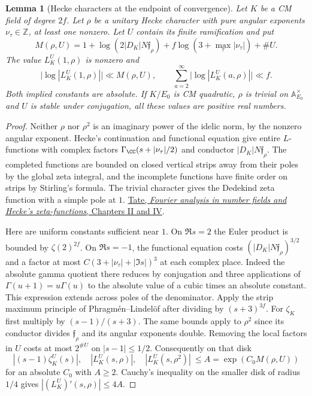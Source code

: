 \documentclass[a4paper,11pt]{article}
\newtheorem{lemma}[proposition]{Lemma}
\theoremstyle{definition}
\theoremstyle{remark}
\newcommand{\ZZ}{\mathbb Z}\newcommand{\ord}{\operatorname{ord}}
\numberwithin{equation}{section}
\begin{document}
\begin{lemma}[Hecke characters at the endpoint of convergence]
\label{lem:hecke171}
Let \(K\) be a CM field of degree \(2f\). Let \(\rho\) be a
unitary Hecke character with pure angular exponents
\(\nu_\tau\in\ZZ\), at least one nonzero. Let \(U\) contain its
finite ramification and put
\[
 M(\rho,U)=1+\log(2|D_K|N\mathfrak f_\rho)
       +f\log(3+\max_\tau|\nu_\tau|)+\#U .
\]
The value \(L_K^U(1,\rho)\) is nonzero and
\[
 \big|\log|L_K^U(1,\rho)|\big|\ll M(\rho,U),\qquad
 \sum_{a=2}^{\infty}\big|\log|L_K^U(a,\rho)|\big|\ll f .
\]
Both implied constants are absolute. If \(K/E_0\) is CM
quadratic, \(\rho\) is trivial on \(\mathbb A_{E_0}^\times\)
and \(U\) is stable under conjugation, all these values are
positive real numbers.
\end{lemma}
\begin{proof}
Neither \(\rho\) nor \(\rho^2\) is an imaginary power of
the idelic norm, by the nonzero angular exponent. Hecke's
continuation and functional equation give entire \(L\)-functions
with complex factors \(\Gamma_{\CC}(s+|\nu_\tau|/2)\) and
conductor \(|D_K|N\mathfrak f_\rho\). The completed functions
are bounded on closed vertical strips away from their poles
by the global zeta integral, and the incomplete functions have
finite order on strips by Stirling's formula. The trivial
character gives the Dedekind zeta function with a simple pole
at \(1\).
\href{https://sites.math.rutgers.edu/~alexk/2023S572/Tate1950.pdf}
{Tate, \emph{Fourier analysis in number fields and Hecke's
zeta-functions}, Chapters II and IV}.

Here are uniform constants sufficient near \(1\).
On \(\Re s=2\) the Euler product is bounded by
\(\zeta(2)^{2f}\). On \(\Re s=-1\), the functional equation
costs \((|D_K|N\mathfrak f_\rho)^{3/2}\) and a factor at most
\(C(3+|\nu_\tau|+|\Im s|)^3\) at each complex place.
Indeed the absolute gamma quotient there reduces by conjugation
and three applications of \(\Gamma(u+1)=u\Gamma(u)\) to
the absolute value of a cubic times an absolute constant.
This expression extends across poles of the denominator.
Apply the strip maximum principle of Phragm\'en--Lindel\"of
after dividing by \((s+3)^{3f}\). For \(\zeta_K\) first
multiply by \((s-1)/(s+3)\). The same bounds apply to
\(\rho^2\) since its conductor divides \(\mathfrak f_\rho\)
and its angular exponents double. Removing the local factors
in \(U\) costs at most \(2^{\#U}\) on \(|s-1|\le1/2\).
Consequently on that disk
\[
 |(s-1)\zeta_K^U(s)|,\quad |L_K^U(s,\rho)|,\quad
 |L_K^U(s,\rho^2)|\ \le A=\exp(C_0 M(\rho,U))
\]
for an absolute \(C_0\) with \(A\ge2\).
Cauchy's inequality on the smaller disk of radius \(1/4\)
gives \(|(L_K^U)'(s,\rho)|\le4A\).


\end{proof}
\end{document}

